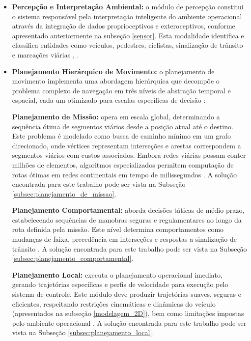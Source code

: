 \begin{itemize}
\item \textbf{Percepção e Interpretação Ambiental:} o módulo de percepção constitui o sistema responsável pela interpretação inteligente do ambiente operacional através da integração de dados proprioceptivos e exteroceptivos, conforme apresentado anteriormente na subseção \ref{sensor}. Esta modalidade identifica e classifica entidades como veículos, pedestres, ciclistas, sinalização de trânsito e marcações viárias \cite[p. ~2]{zheng2023simultaneous}, \cite[p. ~737]{sensors}.

\item \textbf{Planejamento Hierárquico de Movimento:} o planejamento de movimento implementa uma abordagem hierárquica que decompõe o problema complexo de navegação em três níveis de abstração temporal e espacial, cada um otimizado para escalas específicas de decisão \cite[Week 2 - Lesson 3: Software Architecture. ~6min24s]{University_of_Toronto2018-fe}:

\textbf{Planejamento de Missão:} opera em escala global, determinando a sequência ótima de segmentos viários desde a posição atual até o destino. Este problema é modelado como busca de caminho mínimo em um grafo direcionado, onde vértices representam interseções e arestas correspondem a segmentos viários com custos associados. Embora redes viárias possam conter milhões de elementos, algoritmos especializados permitem computação de rotas ótimas em redes continentais em tempo de milissegundos \cite[p. ~3-4]{paden2016survey}. A solução encontrada para este trabalho pode ser vista na Subseção \ref{subsec:planejamento_de_missao}.

\textbf{Planejamento Comportamental:} aborda decisões táticas de médio prazo, estabelecendo sequências de manobras seguras e regulamentares ao longo da rota definida pela missão. Este nível determina comportamentos como mudanças de faixa, precedência em interseções e respostas a sinalização de trânsito \cite[p. ~4]{paden2016survey}. A solução encontrada para este trabalho pode ser vista na Subseção \ref{subsec:planejamento_comportamental}.

\textbf{Planejamento Local:} executa o planejamento operacional imediato, gerando trajetórias específicas e perfis de velocidade para execução pelo sistema de controle. Este módulo deve produzir trajetórias suaves, seguras e eficientes, respeitando restrições cinemáticas e dinâmicas do veículo (apresentados na subseção \ref{modelagem_2D}), bem como limitações impostas pelo ambiente operacional \cite[p. ~3]{paden2016survey}. A solução encontrada para este trabalho pode ser vista na Subseção \ref{subsec:planejamento_local}.


\end{itemize}
